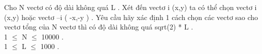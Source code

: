 Cho N vectơ có độ dài không quá L . Xét đến vectơ i (x,y) ta có thể chọn vectơ i (x,y) hoặc vectơ –i ( -x,-y ) . Yêu cầu hãy xác định 1 cách chọn các vectơ sao cho vectơ tổng của N vectơ thì có độ dài không quá sqrt(2) * L .   
\\   1  $\le$  N  $\le$  10000 .   
\\   1  $\le$  L  $\le$  1000 .   
\\

\